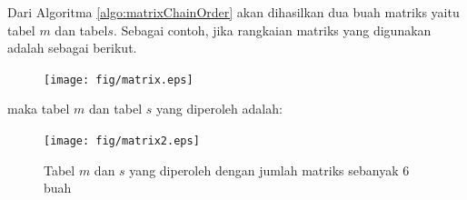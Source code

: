 Dari Algoritma \ref{algo:matrixChainOrder} akan dihasilkan dua buah matriks yaitu tabel $m$ dan tabel$s$. Sebagai contoh, jika rangkaian matriks yang digunakan adalah sebagai berikut.

\begin{figure}
	\texttt{[image: fig/matrix.eps]}%
	\label{fig:matrix}%
\end{figure}

maka tabel $m$ dan tabel $s$ yang diperoleh adalah:
\begin{figure}
	\texttt{[image: fig/matrix2.eps]}%
	\caption{Tabel $m$ dan $s$ yang diperoleh dengan jumlah matriks sebanyak 6 buah}
	\label{fig:matrix2}%
\end{figure}

